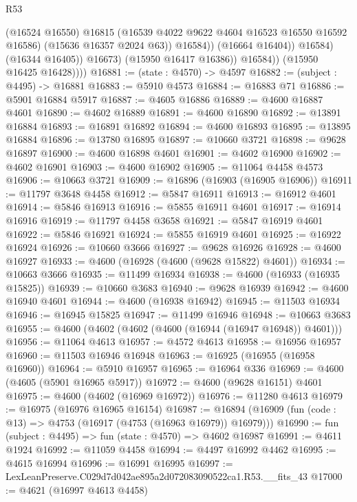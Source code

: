 \begin{lexlean}{R53}
\begin{coremodule}
                              (@16524 @16550)
                              @16815
                              (@16539 @4022 @9622 @4604 @16523 @16550 @16592 @16586)
                              (@15636 @16357 @2024 @63))
                            @16584))
                        (@16664 @16404))
                      @16584)
                    (@16344 @16405))
                  @16673)
                (@15950 @16417 @16386))
              @16584))
          (@15950 @16425 @16428))))
@16881 := (state : @4570) -> @4597
@16882 := (subject : @4495) -> @16881
@16883 := @5910 @4573
@16884 := @16883 @71
@16886 := @5901 @16884 @5917
@16887 := @4605 @16886
@16889 := @4600 @16887 @4601
@16890 := @4602 @16889
@16891 := @4600 @16890
@16892 := @13891 @16884
@16893 := @16891 @16892
@16894 := @4600 @16893
@16895 := @13895 @16884
@16896 := @13780 @16895
@16897 := @10660 @3721
@16898 := @9628 @16897
@16900 := @4600 @16898 @4601
@16901 := @4602 @16900
@16902 := @4602 @16901
@16903 := @4600 @16902
@16905 := @11064 @4458 @4573
@16906 := @10663 @3721
@16909 := @16896 (@16903 (@16905 @16906))
@16911 := @11797 @3648 @4458
@16912 := @5847 @16911
@16913 := @16912 @4601
@16914 := @5846 @16913
@16916 := @5855 @16911 @4601
@16917 := @16914 @16916
@16919 := @11797 @4458 @3658
@16921 := @5847 @16919 @4601
@16922 := @5846 @16921
@16924 := @5855 @16919 @4601
@16925 := @16922 @16924
@16926 := @10660 @3666
@16927 := @9628 @16926
@16928 := @4600 @16927
@16933 := @4600 (@16928 (@4600 (@9628 @15822) @4601))
@16934 := @10663 @3666
@16935 := @11499 @16934
@16938 := @4600 (@16933 (@16935 @15825))
@16939 := @10660 @3683
@16940 := @9628 @16939
@16942 := @4600 @16940 @4601
@16944 := @4600 (@16938 @16942)
@16945 := @11503 @16934
@16946 := @16945 @15825
@16947 := @11499 @16946
@16948 := @10663 @3683
@16955 := @4600 (@4602 (@4602 (@4600 (@16944 (@16947 @16948)) @4601)))
@16956 := @11064 @4613
@16957 := @4572 @4613
@16958 := @16956 @16957
@16960 := @11503 @16946 @16948
@16963 := @16925 (@16955 (@16958 @16960))
@16964 := @5910 @16957
@16965 := @16964 @336
@16969 := @4600 (@4605 (@5901 @16965 @5917))
@16972 := @4600 (@9628 @16151) @4601
@16975 := @4600 (@4602 (@16969 @16972))
@16976 := @11280 @4613
@16979 := @16975 (@16976 @16965 @16154)
@16987 := @16894 (@16909 (fun (code : @13) => @4753 (@16917 (@4753 (@16963 @16979)) @16979)))
@16990 := fun (subject : @4495) => fun (state : @4570) => @4602 @16987
@16991 := @4611 @1924
@16992 := @11059 @4458
@16994 := @4497 @16992 @4462
@16995 := @4615 @16994
@16996 := @16991 @16995
@16997 := LexLeanPreserve.C029d7d042ae895a2d072083090522ca1.R53.__fits_43
@17000 := @4621 (@16997 @4613 @4458)

\end{coremodule}
\end{lexlean}
